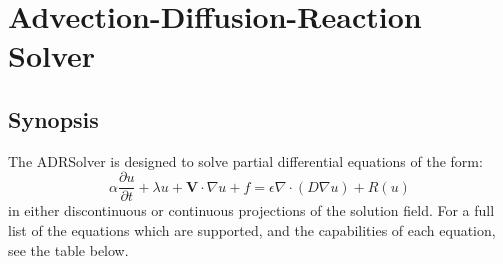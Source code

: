 \chapter{Advection-Diffusion-Reaction Solver}


\section{Synopsis}

The ADRSolver is designed to solve partial differential equations of the form:
\begin{equation}
\alpha \dfrac{\partial u}{\partial t} + \lambda u + \mathbf{V} \cdot \nabla u + f = \epsilon \nabla \cdot (D \nabla u) + R(u)
\end{equation}
in either discontinuous or continuous projections of the solution field.
For a full list of the equations which are supported, and the capabilities of each equation,
see the table below.

